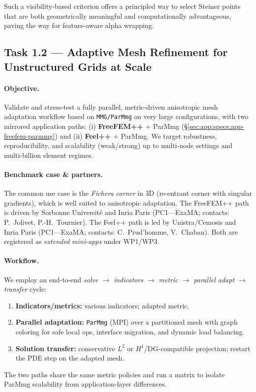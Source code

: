 Such a visibility-based criterion offers a principled way to select Steiner points that are both geometrically meaningful and computationally advantageous, paving the way for feature-aware alpha wrapping.

\subsection{Task 1.2 — Adaptive Mesh Refinement for Unstructured Grids at Scale}
\label{sec:wp1:t1.2}

\paragraph{Objective.}
Validate and stress-test a fully parallel, metric-driven anisotropic mesh adaptation workflow based on \texttt{MMG/ParMmg} on very large configurations, with two mirrored application paths:
(i) \textbf{FreeFEM++} + ParMmg (\S\ref{sec:app:specs:app-freefem-parmmg}) and
(ii) \textbf{Feel++} + ParMmg.
We target robustness, reproducibility, and scalability (weak/strong) up to multi-node settings and multi-billion element regimes.

\paragraph{Benchmark case \& partners.}
The common use case is the \emph{Fichera corner} in 3D (re-entrant corner with singular gradients), which is well suited to anisotropic adaptation.
The FreeFEM++ path is driven by Sorbonne Université and Inria Paris (PC1—ExaMA; contacts: P.~Jolivet, P.-H.~Tournier).
The Feel++ path is led by Unistra/Cemosis and Inria Paris (PC1—ExaMA; contacts: C.~Prud’homme, V.~Chaban).
Both are registered as \emph{extended mini-apps} under WP1/WP3.

\paragraph{Workflow.}
We employ an end-to-end \emph{solve $\rightarrow$ indicators $\rightarrow$ metric $\rightarrow$ parallel adapt $\rightarrow$ transfer} cycle:
\begin{enumerate}
  \item \textbf{Indicators/metrics:} various indicators; adapted metric.
  \item \textbf{Parallel adaptation:} \texttt{ParMmg} (MPI) over a partitioned mesh with graph coloring for safe local ops, interface migration, and dynamic load balancing.
  \item \textbf{Solution transfer:} conservative $L^2$ or $H^1$/DG-compatible projection; restart the PDE step on the adapted mesh.
\end{enumerate}
The two paths share the same metric policies and run a matrix to isolate ParMmg scalability from application-layer differences.


